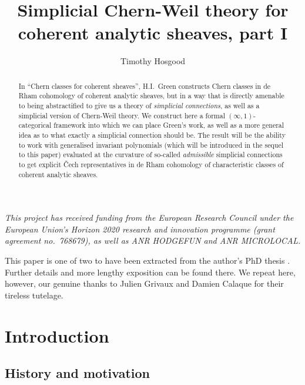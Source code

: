 \documentclass[11pt,fleqn]{article}
\title{Simplicial Chern-Weil theory for coherent analytic sheaves, part I}
\author{Timothy Hosgood}
\theoremstyle{plain}
\theoremstyle{definition}
\theoremstyle{remark}
\numberwithin{equation}{theorem}
\begin{document}
\maketitle

\begin{abstract}
    In ``Chern classes for coherent sheaves'', H.I.~Green constructs Chern classes in de Rham cohomology of coherent analytic sheaves, but in a way that is directly amenable to being abstractified to give us a theory of \emph{simplicial connections}, as well as a simplicial version of Chern-Weil theory.
    We construct here a formal $(\infty,1)$-categorical framework into which we can place Green's work, as well as a more general idea as to what exactly a simplicial connection should be.
    The result will be the ability to work with generalised invariant polynomials (which will be introduced in the sequel to this paper) evaluated at the curvature of so-called \emph{admissible} simplicial connections to get explicit Čech representatives in de Rham cohomology of characteristic classes of coherent analytic sheaves.
\end{abstract}

\tableofcontents

\bigskip

\begin{center}
    \emph{This project has received funding from the European Research Council under the European Union’s Horizon 2020 research and innovation programme (grant agreement no.~768679), as well as ANR HODGEFUN and ANR MICROLOCAL.}
\end{center}

\medskip

{This paper is one of two to have been extracted from the author's PhD thesis \cite{Hosgood2020}. Further details and more lengthy exposition can be found there. We repeat here, however, our genuine thanks to Julien Grivaux and Damien Calaque for their tireless tutelage.}


\section{Introduction}


    \subsection{History and motivation}
\end{document}
